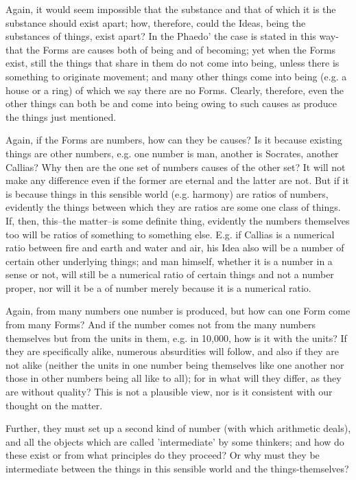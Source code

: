 \documentclass{article}
\begin{document}
Again, it would seem impossible that the substance and that of which it is the substance should exist apart; how, therefore, could the Ideas, being the substances of things, exist apart? In the Phaedo' the case is stated in this way-that the Forms are causes both of being and of becoming; yet when the Forms exist, still the things that share in them do not come into being, unless there is something to originate movement; and many other things come into being (e.g. a house or a ring) of which we say there are no Forms. Clearly, therefore, even the other things can both be and come into being owing to such causes as produce the things just mentioned.

Again, if the Forms are numbers, how can they be causes? Is it because existing things are other numbers, e.g. one number is man, another is Socrates, another Callias? Why then are the one set of numbers causes of the other set? It will not make any difference even if the former are eternal and the latter are not. But if it is because things in this sensible world (e.g. harmony) are ratios of numbers, evidently the things between which they are ratios are some one class of things. If, then, this--the matter--is some definite thing, evidently the numbers themselves too will be ratios of something to something else. E.g. if Callias is a numerical ratio between fire and earth and water and air, his Idea also will be a number of certain other underlying things; and man himself, whether it is a number in a sense or not, will still be a numerical ratio of certain things and not a number proper, nor will it be a of number merely because it is a numerical ratio.

Again, from many numbers one number is produced, but how can one Form come from many Forms? And if the number comes not from the many numbers themselves but from the units in them, e.g. in 10,000, how is it with the units? If they are specifically alike, numerous absurdities will follow, and also if they are not alike (neither the units in one number being themselves like one another nor those in other numbers being all like to all); for in what will they differ, as they are without quality? This is not a plausible view, nor is it consistent with our thought on the matter.

Further, they must set up a second kind of number (with which arithmetic deals), and all the objects which are called 'intermediate' by some thinkers; and how do these exist or from what principles do they proceed? Or why must they be intermediate between the things in this sensible world and the things-themselves?
\end{document}
